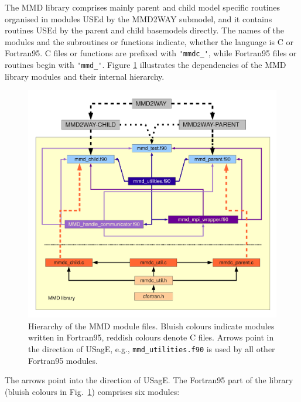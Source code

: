 \documentclass[twoside]{article}
\begin{document}
The MMD library comprises mainly parent and child model specific routines
organised in modules USEd by the MMD2WAY submodel,
and it contains routines USEd by the parent and child basemodels 
directly.
The names of the modules and the subroutines or functions indicate, whether 
the language is C or Fortran95. C files or functions are prefixed with 
\verb|'mmdc_'|, while Fortran95 files or routines begin with \verb|'mmd_'|. 
 Figure \ref{fig:MMD-files} illustrates the dependencies
 of the MMD library modules and their internal hierarchy.
\begin{figure}
\begin{center} 
\includegraphics[width=\textwidth]{MMDlib_files.pdf} 
\end{center} 
\caption{Hierarchy of the MMD module files. Bluish colours indicate modules 
written in Fortran95, reddish colours denote C files. Arrows point in the
direction of USagE, e.g., {\tt mmd\_utilities.f90} is used by all other 
Fortran95 modules.} 
\label{fig:MMD-files} 
\end{figure}
The arrows point into the direction of USagE. The Fortran95 part of the 
library (bluish colours in Fig.\ \ref{fig:MMD-files}) comprises six modules:
\end{document}
